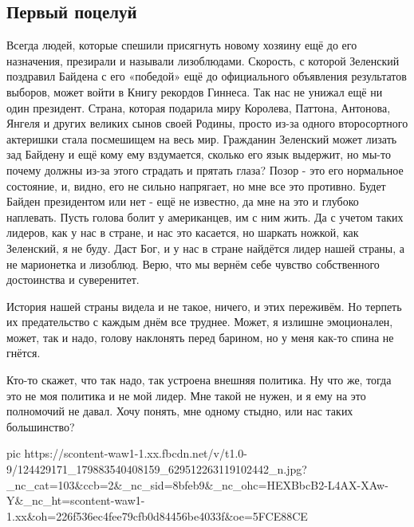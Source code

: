  
 
 

\subsection{Первый поцелуй}
\label{sec:08_11_2020.fb.alex_belyy.1.pervyy_pocelyi}

Всегда людей, которые спешили присягнуть новому хозяину ещё до его назначения,
презирали и называли лизоблюдами. Скорость, с которой Зеленский поздравил
Байдена с его «победой» ещё до официального объявления результатов выборов,
может войти в Книгу рекордов Гиннеса. Так нас не унижал ещё ни один президент.
Страна, которая подарила миру Королева, Паттона, Антонова, Янгеля и других
великих сынов своей Родины, просто из-за одного второсортного актеришки стала
посмешищем на весь мир. Гражданин Зеленский может лизать зад Байдену и ещё кому
ему вздумается, сколько его язык выдержит, но мы-то почему должны из-за этого
страдать и прятать глаза? Позор - это его нормальное состояние, и, видно, его
не сильно напрягает, но мне все это противно. Будет Байден президентом или нет
- ещё не известно, да мне на это и глубоко наплевать. Пусть голова болит у
американцев, им с ним жить. Да с учетом таких лидеров, как у нас в стране, и
нас это касается, но шаркать ножкой, как Зеленский, я не буду. Даст Бог, и у
нас в стране найдётся лидер нашей страны, а не марионетка и лизоблюд.  Верю,
что мы вернём себе чувство собственного достоинства и суверенитет. 

История нашей страны видела и не такое, ничего, и этих переживём. Но терпеть их
предательство с каждым днём все труднее.  Может, я излишне эмоционален, может,
так и надо, голову наклонять перед барином, но у меня как-то спина не гнётся.

Кто-то скажет, что так надо, так устроена внешняя политика. Ну что же, тогда
это не моя политика и не мой лидер. Мне такой не нужен, и я ему на это
полномочий не давал. Хочу понять, мне одному стыдно, или нас таких большинство?

\ifcmt
pic https://scontent-waw1-1.xx.fbcdn.net/v/t1.0-9/124429171_179883540408159_629512263119102442_n.jpg?_nc_cat=103&ccb=2&_nc_sid=8bfeb9&_nc_ohc=HEXBbcB2-L4AX-XAw-Y&_nc_ht=scontent-waw1-1.xx&oh=226f536ec4fee79cfb0d84456be4033f&oe=5FCE88CE
\fi
